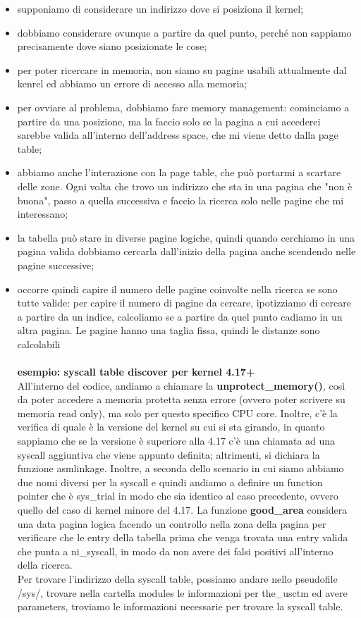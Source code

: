 \documentclass[12pt, oneside]{extbook}
\begin{document}
\begin{itemize}
\item supponiamo di considerare un indirizzo dove si posiziona il kernel;
\item dobbiamo considerare ovunque a partire da quel punto, perché non sappiamo precisamente dove siano posizionate le cose;
\item per poter ricercare in memoria, non siamo su pagine usabili attualmente dal kenrel ed abbiamo un errore di accesso alla memoria;
\item per ovviare al problema, dobbiamo fare memory management: cominciamo a partire da una posizione, ma la faccio solo se la pagina a cui accederei sarebbe valida all'interno dell'address space, che mi viene detto dalla page table;
\item abbiamo anche l'interazione con la page table, che può portarmi a scartare delle zone. Ogni volta che trovo un indirizzo che sta in una pagina che "non è buona", passo a quella successiva e faccio la ricerca solo nelle pagine che mi interessano;
\item la tabella può stare in diverse pagine logiche, quindi quando cerchiamo in una pagina valida dobbiamo cercarla dall'inizio della pagina anche scendendo nelle pagine successive;
\item occorre quindi capire il numero delle pagine coinvolte nella ricerca se sono tutte valide: per capire il numero di pagine da cercare, ipotizziamo di cercare a partire da un indice, calcoliamo se a partire da quel punto cadiamo in un altra pagina. Le pagine hanno una taglia fissa, quindi le distanze sono calcolabili\\\\
\textbf{esempio: syscall table discover per kernel 4.17+}\\
All'interno del codice, andiamo a chiamare la \textbf{unprotect\_memory()}, così da poter accedere a memoria protetta senza errore (ovvero poter scrivere su memoria read only), ma solo per questo specifico CPU core. Inoltre, c'è la verifica di quale è la versione del kernel su cui si sta girando, in quanto sappiamo che se la versione è superiore alla 4.17 c'è una chiamata ad una syscall aggiuntiva che viene appunto definita; altrimenti, si dichiara la funzione asmlinkage. Inoltre, a seconda dello scenario in cui siamo abbiamo due nomi diversi per la syscall e quindi andiamo a definire un function pointer che è sys\_trial in modo che sia identico al caso precedente, ovvero quello del caso di kernel minore del 4.17. La funzione \textbf{good\_area} considera una data pagina logica facendo un controllo nella zona della pagina per verificare che le entry della tabella prima che venga trovata una entry valida che punta a ni\_syscall, in modo da non avere dei falsi positivi all'interno della ricerca.\\ Per trovare l'indirizzo della syscall table, possiamo andare nello pseudofile /sys/, trovare nella cartella modules le informazioni per the\_usctm ed avere parameters, troviamo le informazioni necessarie per trovare la syscall table.
\end{itemize}
\end{document}
